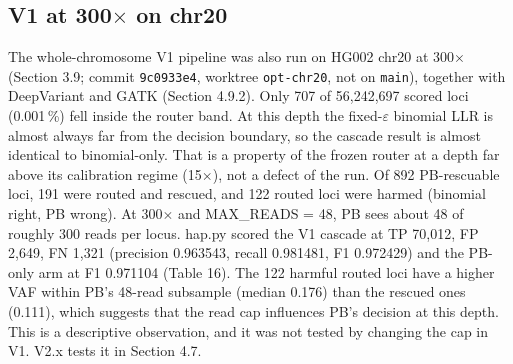 \documentclass[11pt,a4paper]{article}
\makeatletter
\newcommand{\needspace}[1]{\par\ifdim\pagegoal=\maxdimen\else\dimen@=\pagegoal\advance\dimen@-\pagetotal\ifdim\dimen@<#1\relax\newpage\fi\fi}
\makeatother
\begin{document}
\subsection{\texorpdfstring{V1 at 300$\times$ on chr20}{V1 at 300x on chr20}}
The whole-chromosome V1 pipeline was also run on HG002 chr20 at 300$\times$ (Section 3.9; commit \texttt{9c0933e4}, worktree \texttt{opt-chr20}, not on \texttt{main}), together with DeepVariant and GATK (Section 4.9.2). Only 707 of 56,242,697 scored loci (0.001\,\%) fell inside the router band. At this depth the fixed-$\varepsilon$ binomial LLR is almost always far from the decision boundary, so the cascade result is almost identical to binomial-only. That is a property of the frozen router at a depth far above its calibration regime (15$\times$), not a defect of the run. Of 892 PB-rescuable loci, 191 were routed and rescued, and 122 routed loci were harmed (binomial right, PB wrong). At 300$\times$ and MAX\_READS = 48, PB sees about 48 of roughly 300 reads per locus. hap.py scored the V1 cascade at TP 70,012, FP 2,649, FN 1,321 (precision 0.963543, recall 0.981481, F1 0.972429) and the PB-only arm at F1 0.971104 (Table 16). The 122 harmful routed loci have a higher VAF within PB's 48-read subsample (median 0.176) than the rescued ones (0.111), which suggests that the read cap influences PB's decision at this depth. This is a descriptive observation, and it was not tested by changing the cap in V1. V2.x tests it in Section 4.7.

\needspace{6\baselineskip}
\end{document}
